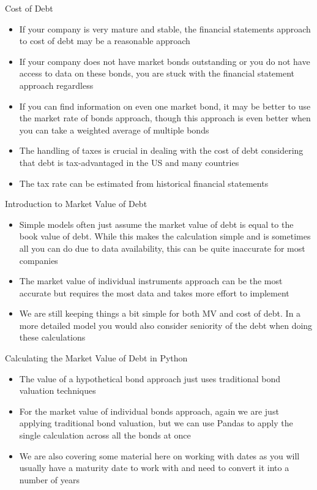 \documentclass[]{article}
\begin{document}
\begin{section}{Cost of Debt}
\begin{itemize}
\item If your company is very mature and stable, the financial statements approach to cost of debt may be a reasonable approach
\item If your company does not have market bonds outstanding or you do not have access to data on these bonds, you are stuck with the financial statement approach regardless
\item If you can find information on even one market bond, it may be better to use the market rate of bonds approach, though this approach is even better when you can take a weighted average of multiple bonds
\item The handling of taxes is crucial in dealing with the cost of debt considering that debt is tax-advantaged in the US and many countries
\item The tax rate can be estimated from historical financial statements
\end{itemize}
\end{section}
\begin{section}{Introduction to Market Value of Debt}
\begin{itemize}
\item Simple models often just assume the market value of debt is equal to the book value of debt. While this makes the calculation simple and is sometimes all you can do due to data availability, this can be quite inaccurate for most companies
\item The market value of individual instruments approach can be the most accurate but requires the most data and takes more effort to implement
\item We are still keeping things a bit simple for both MV and cost of debt. In a more detailed model you would also consider seniority of the debt when doing these calculations
\end{itemize}
\end{section}
\begin{section}{Calculating the Market Value of Debt in Python}
\begin{itemize}
\item The value of a hypothetical bond approach just uses traditional bond valuation techniques
\item For the market value of individual bonds approach, again we are just applying traditional bond valuation, but we can use Pandas to apply the single calculation across all the bonds at once
\item We are also covering some material here on working with dates as you will usually have a maturity date to work with and need to convert it into a number of years
\end{itemize}
\end{section}
\end{document}
